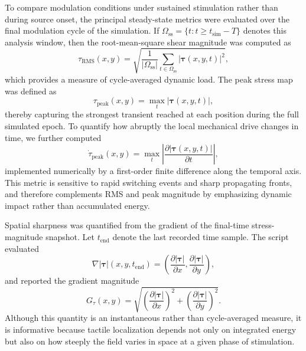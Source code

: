 \documentclass[pdflatex, sn-nature]{sn-jnl}
\theoremstyle{thmstyleone}%
\theoremstyle{thmstyletwo}%
\theoremstyle{thmstylethree}%
\begin{document}
To compare modulation conditions under sustained stimulation rather than during source onset, the principal steady-state metrics were evaluated over the final modulation cycle of the simulation. If $\Omega_{\mathrm{ss}}=\{t: t\ge t_{\mathrm{sim}}-T\}$ denotes this analysis window, then the root-mean-square shear magnitude was computed as
\begin{equation}
    \tau_{\mathrm{RMS}}(x,y)=\sqrt{\frac{1}{|\Omega_{\mathrm{ss}}|}\sum_{t\in\Omega_{\mathrm{ss}}}|\boldsymbol{\tau}(x,y,t)|^2},
\end{equation}
which provides a measure of cycle-averaged dynamic load. The peak stress map was defined as
\begin{equation}
    \tau_{\mathrm{peak}}(x,y)=\max_t |\boldsymbol{\tau}(x,y,t)|,
\end{equation}
thereby capturing the strongest transient reached at each position during the full simulated epoch. To quantify how abruptly the local mechanical drive changes in time, we further computed
\begin{equation}
    \dot{\tau}_{\mathrm{peak}}(x,y)=\max_t \left|\frac{\partial |\boldsymbol{\tau}(x,y,t)|}{\partial t}\right|,
\end{equation}
implemented numerically by a first-order finite difference along the temporal axis. This metric is sensitive to rapid switching events and sharp propagating fronts, and therefore complements RMS and peak magnitude by emphasizing dynamic impact rather than accumulated energy.

Spatial sharpness was quantified from the gradient of the final-time stress-magnitude snapshot. Let $t_{\mathrm{end}}$ denote the last recorded time sample. The script evaluated
\begin{equation}
    \nabla |\boldsymbol{\tau}|(x,y,t_{\mathrm{end}})=
    \left(
    \frac{\partial |\boldsymbol{\tau}|}{\partial x},
    \frac{\partial |\boldsymbol{\tau}|}{\partial y}
    \right),
\end{equation}
and reported the gradient magnitude
\begin{equation}
    G_{\tau}(x,y)=\sqrt{\left(\frac{\partial |\boldsymbol{\tau}|}{\partial x}\right)^2+
        \left(\frac{\partial |\boldsymbol{\tau}|}{\partial y}\right)^2}.
\end{equation}
Although this quantity is an instantaneous rather than cycle-averaged measure, it is informative because tactile localization depends not only on integrated energy but also on how steeply the field varies in space at a given phase of stimulation.
\end{document}
